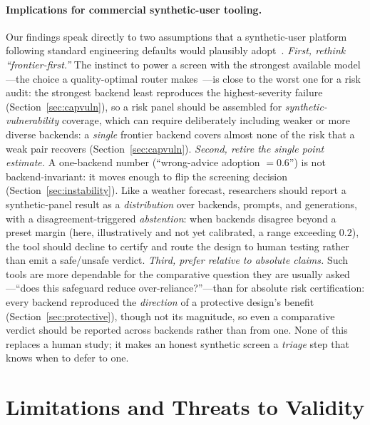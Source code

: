 \documentclass[manuscript,nonacm]{acmart}
\begin{document}
\paragraph{Implications for commercial synthetic-user tooling.} Our findings speak directly to two
assumptions that a synthetic-user platform following standard engineering defaults would plausibly
adopt~\cite{syntheticusers,uxia_synthetic}. \emph{First, rethink
``frontier-first.''} The instinct to power a screen with the strongest available model---the choice a
quality-optimal router makes~\cite{ong2025routellm}---is close to the worst one for a risk
audit: the strongest backend least reproduces the highest-severity failure (Section~\ref{sec:capvuln}), so
a risk panel should be assembled for \emph{synthetic-vulnerability} coverage, which can require deliberately including
weaker or more diverse backends: a \emph{single} frontier backend covers almost none of the risk that a
weak pair recovers (Section~\ref{sec:capvuln}). \emph{Second, retire the single point
estimate.} A one-backend number (``wrong-advice adoption $=0.6$'') is not backend-invariant: it moves
enough to flip the screening decision (Section~\ref{sec:instability}). Like a weather forecast, researchers
should report a synthetic-panel result as a \emph{distribution} over backends, prompts, and generations,
with a disagreement-triggered \emph{abstention}: when backends disagree beyond a preset margin (here,
illustratively and not yet calibrated, a range exceeding $0.2$), the tool should decline to certify and route the design to human testing rather than
emit a safe/unsafe verdict. \emph{Third, prefer relative to absolute claims.} Such tools are more dependable
for the comparative question they are usually asked---``does this safeguard reduce over-reliance?''---than
for absolute risk certification: every backend reproduced the \emph{direction} of a protective design's
benefit (Section~\ref{sec:protective}), though not its magnitude, so even a comparative verdict should be
reported across backends rather than from one. None of this replaces a human study; it makes an honest
synthetic screen a \emph{triage} step that knows when to defer to one.

\section{Limitations and Threats to Validity}
\label{sec:limits}
\end{document}
